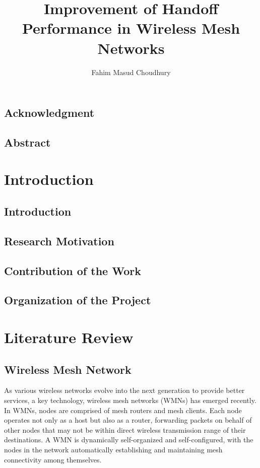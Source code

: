 \documentclass[12pt,a4paper]{report}
\author{Fahim Masud Choudhury}
\title{Improvement of Handoff Performance in Wireless Mesh Networks}
\begin{document}
\maketitle
\tableofcontents
\newpage
\begin{center}
\section*{Acknowledgment}
\end{center}
\newpage
\begin{center}
\section*{Abstract}
\end{center}

\chapter{Introduction}
\section{Introduction}
\section{Research Motivation}
\section{Contribution of the Work}
\section{Organization of the Project}

\chapter{Literature Review}

\section{Wireless Mesh Network}
As various wireless networks evolve into the next generation to provide better services, a key technology, wireless mesh networks (WMNs) has emerged recently. In WMNs, nodes are comprised of mesh routers and mesh clients. Each node operates not only as a host but
also as a router, forwarding packets on behalf of other nodes that may not be within direct
wireless transmission range of their destinations. A WMN is dynamically self-organized and self-configured, with the nodes in the network automatically establishing and maintaining
mesh connectivity among themselves. 
\end{document}

